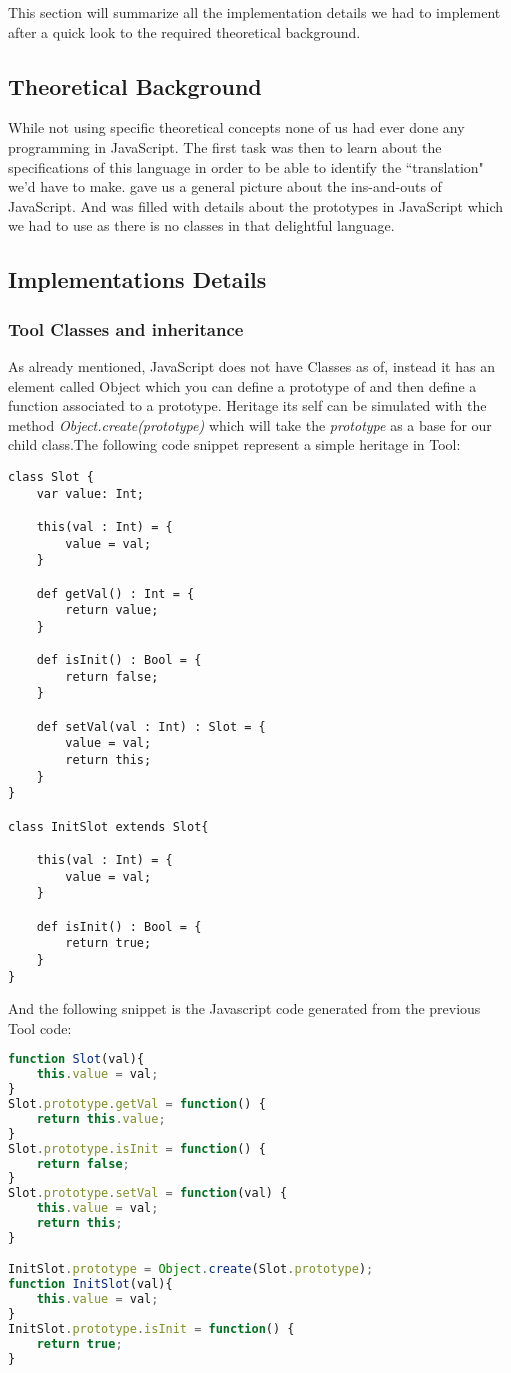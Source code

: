 This section will summarize all the implementation details we had to implement after a quick
look to the required theoretical background.

\subsection{Theoretical Background}
While not using specific theoretical concepts none of us had ever done any programming in JavaScript.
The first task was then to learn about the specifications of this language in order to be able to identify the ``translation" we'd have to make. \cite{JSGood} gave us a general picture about the ins-and-outs of JavaScript.
And \cite{JSProto} was filled with details about the prototypes in JavaScript which we had to use as there is no classes in that delightful language.

\subsection{Implementations Details}
\subsubsection{Tool Classes and inheritance}
As already mentioned, JavaScript does not have Classes as of, instead it has an element called Object which you can define a prototype of and then define a function associated to a prototype. Heritage its self can be simulated with the method \emph{Object.create(prototype)} which will take the \emph{prototype} as a base for our child class.The following code snippet represent a simple heritage in Tool:
\begin{lstlisting}
class Slot {
	var value: Int;

	this(val : Int) = {
		value = val;
	}

	def getVal() : Int = {
		return value;
	}

	def isInit() : Bool = {
		return false;
	}

	def setVal(val : Int) : Slot = {
		value = val;
		return this;
	}
}

class InitSlot extends Slot{

	this(val : Int) = {
		value = val;
	}

	def isInit() : Bool = {
		return true;
	}
}
\end{lstlisting}

And the following snippet is the Javascript code generated from the previous Tool code:
\begin{lstlisting}[language=javascript]
function Slot(val){
    this.value = val;
}
Slot.prototype.getVal = function() {
    return this.value;
}
Slot.prototype.isInit = function() {
    return false;
}
Slot.prototype.setVal = function(val) {
    this.value = val;
    return this;
}

InitSlot.prototype = Object.create(Slot.prototype);
function InitSlot(val){
    this.value = val;
}
InitSlot.prototype.isInit = function() {
    return true;
}

\end{lstlisting}


